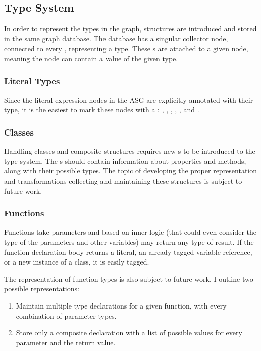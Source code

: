 \subsection{Type System}
In order to represent the types in the graph, structures are introduced and stored in the same graph database. The database has a singular  collector node, connected to every , representing a type. These s are attached to a given node, meaning the node can contain a value of the given type.

\subsubsection{Literal Types}
Since the literal expression nodes in the ASG are explicitly annotated with their type, it is the easiest to mark these nodes with a : , , , , , and .

\subsubsection{Classes}
Handling classes and composite structures requires new s to be introduced to the type system. The s should contain information about properties and methods, along with their possible types. The topic of developing the proper representation and transformations collecting and maintaining these structures is subject to future work.

\subsubsection{Functions}
Functions take parameters and based on inner logic (that could even consider the type of the parameters and other variables) may return any type of result. If the function declaration body returns a literal, an already tagged variable reference, or a new instance of a class, it is easily tagged.

The representation of function types is also subject to future work. I outline two possible representations:
\begin{enumerate}
	\item Maintain multiple type declarations for a given function, with every combination of parameter types.
	\item Store only a composite declaration with a list of possible values for every parameter and the return value.
\end{enumerate}

